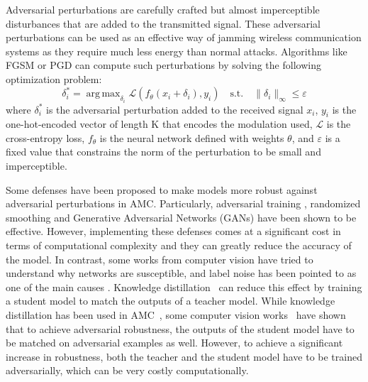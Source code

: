 \documentclass[conference]{IEEEtran}
\newcommand{\pf}[1]{{\textcolor{orange}{PF: {#1}}}}
\newcommand{\Ls}{\mathcal{L}}
\DeclareMathOperator*{\argmax}{arg\,max}
\begin{document}
%
Adversarial perturbations are carefully crafted but almost imperceptible disturbances that are added to the transmitted signal. These adversarial perturbations can be used as an effective way of jamming wireless communication systems as they require much less energy than normal attacks. Algorithms like FGSM \cite{Goodfellow_Shlens_Szegedy_2015} or PGD \cite{Madry_Makelov_Schmidt_Tsipras_Vladu_2019} can compute such perturbations by solving the following optimization problem:
\begin{equation}
\label{eq:adv_pert}
    \delta_i^* = \argmax_{\delta_i}\Ls(f_{\theta}(x_i + \delta_i), y_i) \quad \text{s.t.} \quad \lVert \delta_i \rVert_{\infty} \leq \varepsilon
\end{equation}
where $\delta_i^*$ is the adversarial perturbation added to the received signal $x_i$, $y_i$ is the one-hot-encoded vector of length K that encodes the modulation used, $\Ls$ is the cross-entropy loss, $f_{\theta}$ is the neural network defined with weights $\theta$, and $\varepsilon$ is a fixed value that constrains the norm of the perturbation to be small and imperceptible.

Some defenses have been proposed to make models more robust against adversarial perturbations in AMC. Particularly, adversarial training \cite{maroto2021safeamc,manoj2022toward}, randomized smoothing \cite{kim2021channel,manoj2022toward} and Generative Adversarial Networks (GANs) \cite{wang2022gan} have been shown to be effective. However, implementing these defenses comes at a significant cost in terms of computational complexity and they can greatly reduce the accuracy of the model.
In contrast, some works from computer vision have tried to understand why networks are susceptible, and label noise has been pointed to as one of the main causes \cite{sanyal2020benign}. Knowledge distillation~\cite{hinton2015distilling,romero2014fitnets,zagoruyko2016paying,chebotar2016distilling} can reduce this effect by training a student model to match the outputs of a teacher model. While knowledge distillation has been used in AMC~\cite{ma2020cross}, some computer vision works~\cite{goldblum2020adversarially,zi2021revisiting,shao2021and,maroto2022benefits} have shown that to achieve adversarial robustness, the outputs of the student model have to be matched on adversarial examples as well. However, to achieve a significant increase in robustness, both the teacher and the student model have to be trained adversarially, which can be very costly computationally. 
\end{document}

